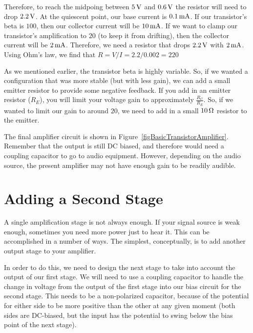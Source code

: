 Therefore, to reach the midpoing between $5\,\si{\volt}$ and $0.6\,\si{\volt}$ the resistor will need to drop $2.2\,\si{\volt}$.
At the quiescent point, our base current is $0.1\,\si{\milli\ampere}$.
If our transistor's beta is $100$, then our collector current will be $10\,\si{\milli\ampere}$.
If we want to clamp our transistor's amplification to $20$ (to keep it from drifting), then the collector current will be $2\,\si{\milli\ampere}$.
Therefore, we need a resistor that drops $2.2\,\si{\volt}$ with $2\,\si{\milli\ampere}$.
Using Ohm's law, we find that $R = V / I = 2.2 / 0.002 = 220$

As we mentioned earlier, the transistor beta is highly variable.
So, if we wanted a configuration that was more stable (but with less gain), we can add a small emitter resistor to provide some negative feedback.
If you add in an emitter resistor ($R_E$), you will limit your voltage gain to approximately $\frac{R_C}{R_E}$.
So, if we wanted to limit our gain to around $20$, we need to add in a small $10\,\si{\ohm}$ resistor to the emitter.


The final amplifier circuit is shown in Figure~\ref{figBasicTransistorAmplifier}.
Remember that the output is still DC biased, and therefore would need a coupling capacitor to go to audio equipment.
However, depending on the audio source, the present amplifier may not have enough gain to be readily audible.

\section{Adding a Second Stage}
\label{secMultiStageAmp}

A single amplification stage is not always enough.
If your signal source is weak enough, sometimes you need more power just to hear it.
This can be accomplished in a number of ways.
The simplest, conceptually, is to add another output stage to your amplifier.

In order to do this, we need to design the next stage to take into account the output of our first stage.
We will need to use a coupling capacitor to handle the change in voltage from the output of the first stage into our bias circuit for the second stage.
This needs to be a non-polarized capacitor, because of the potential for either side to be more positive than the other at any given moment (both sides are DC-biased, but the input has the potential to swing below the bias point of the next stage).

